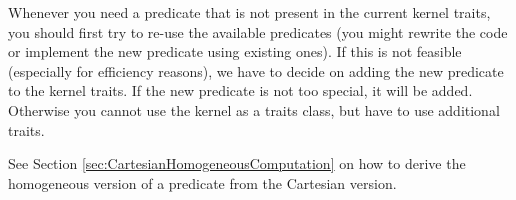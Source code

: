 Whenever you need a predicate that is not present in the current kernel
traits, you should first try to re-use the available predicates (you
might rewrite the code or implement the new predicate using existing ones).
If this is not feasible (especially for efficiency reasons), we have to 
decide on adding the new predicate to the kernel traits. 
If the new predicate is not too special, it will be added. 
Otherwise you cannot use the kernel as a traits class, but have
to use additional traits.%

See Section \ref{sec:CartesianHomogeneousComputation} on how to derive the
homogeneous version of a predicate from the Cartesian version. 


